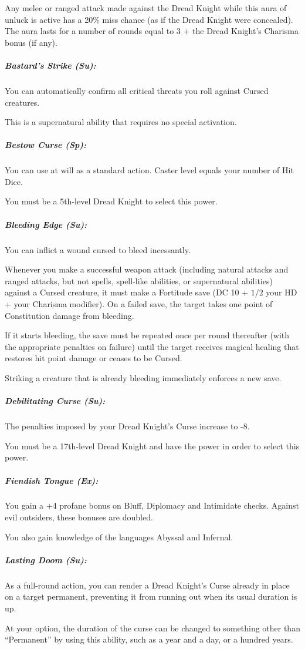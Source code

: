 Any melee or ranged attack made against the Dread Knight while this aura of unluck is active has a 20\% miss chance (as if the Dread Knight were concealed). The aura lasts for a number of rounds equal to 3 + the Dread Knight's Charisma bonus (if any).

\subparagraph{Bastard's Strike (Su):}
You can automatically confirm all critical threats you roll against Cursed creatures.

This is a supernatural ability that requires no special activation.

\subparagraph{Bestow Curse (Sp):}
You can use  at will as a standard action. Caster level equals your number of Hit Dice.

You must be a 5th-level Dread Knight to select this power.
\subparagraph{Bleeding Edge (Su):}
You can inflict a wound cursed to bleed incessantly. 

Whenever you make a successful weapon attack (including natural attacks and ranged attacks, but not spells, spell-like abilities, or supernatural abilities) against a Cursed creature, it must make a Fortitude save (DC 10 + $1/2$ your HD + your Charisma modifier). On a failed save, the target takes one point of Constitution damage from bleeding.

If it starts bleeding, the save must be repeated once per round thereafter (with the appropriate penalties on failure) until the target receives magical healing that restores hit point damage or ceases to be Cursed.

Striking a creature that is already bleeding immediately enforces a new save.

\subparagraph{Debilitating Curse (Su):}
The penalties imposed by your Dread Knight's Curse increase to -8.

You must be a 17th-level Dread Knight and have the  power in order to select this power.

\subparagraph{Fiendish Tongue (Ex):} You gain a +4 profane bonus on Bluff, Diplomacy and Intimidate checks. Against evil outsiders, these bonuses are doubled.

You also gain knowledge of the languages Abyssal and Infernal.

\subparagraph{Lasting Doom (Su):}
As a full-round action, you can render a Dread Knight's Curse already in place on a target permanent, preventing it from running out when its usual duration is up.

At your option, the duration of the curse can be changed to something other than ``Permanent'' by using this ability, such as a year and a day, or a hundred years.


